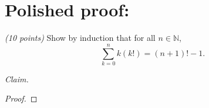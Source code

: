 \documentclass[11pt]{article}
\begin{document}
\section*{Polished proof:} 

\emph{(10 points)} Show by induction that for all \(n \in \mathbb{N}\), 
\[
\sum_{k = 0}^n k (k!) = (n+1)! - 1.
\]



\noindent \emph{Claim.}

\begin{proof}
\end{proof}
\end{document}
